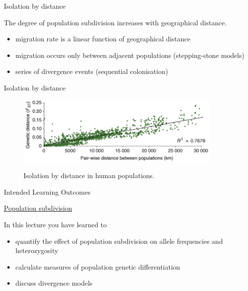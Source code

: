 \begin{frame}{Isolation by distance}

	\begin{block}{}
		The degree of population subdivision increases with geographical distance.
	\end{block}

	\bigskip

	\begin{itemize}
		\item migration rate is a linear function of geographical distance
		\item migration occurs only between adjacent populations (stepping-stone models)
		\item series of divergence events (sequential colonisation)
	\end{itemize}

\end{frame}

\begin{frame}{Isolation by distance}

	\begin{figure}
                \includegraphics[width=0.9\textwidth]{Pics/handley} \
                \caption{\small Isolation by distance in human populations.}
        \end{figure}

\end{frame}


\begin{frame}{Intended Learning Outcomes}

        \underline{Population subdivision}

        \bigskip

        In this lecture you have learned to
        \begin{itemize}
                \item quantify the effect of population subdivision on allele frequencies and heterozygosity
                \item calculate measures of population genetic differentiation
                \item discuss divergence models
        \end{itemize}

\end{frame}


